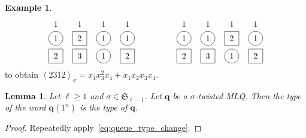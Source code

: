 \documentclass[reqno]{amsart}
\newcommand{\0}{\phantom{c}}
\newcommand{\swt}[1]{\left\langle #1 \right\rangle} %
\newcommand{\SymGp}[1]{\mathfrak{S}_{#1}} %
\newcommand{\qq}{\mathbf{q}}
\newenvironment{vershort}{}{}
\theoremstyle{plain}
\newtheorem{lemma}[thm]{Lemma}
\theoremstyle{definition}
\newtheorem{example}[thm]{Example}
\numberwithin{equation}{section}
\begin{document}
\begin{example}
\[
\begin{tikzpicture}[baseline=-30]
  \def\ll{0.75}   %
  \foreach \i in {1,3,4} { \draw (\i,\ll*-1) circle (0.3); }
  \foreach \i in {2} { \draw (\i-.3,\ll*-1 -.3) rectangle +(0.6,+0.6); }
  \foreach \i in {3} { \draw (\i,\ll*-2) circle (0.3); }
  \foreach \i in {1,2,4} { \draw (\i-.3,\ll*-2 -.3) rectangle +(0.6,+0.6); }
  \foreach \i in {1,2,3,4} { \node at (\i, \ll*0-.15) {$1$}; }
  \foreach \i in {1,3,4} { \node at (\i, \ll*-1) {$1$}; }
  \foreach \i in {2} { \node at (\i, \ll*-1) {$2$}; }
  \foreach \i in {3} { \node at (\i, \ll*-2) {$1$}; }
  \foreach \i in {1,4} { \node at (\i, \ll*-2) {$2$}; }
  \foreach \i in {2} { \node at (\i, \ll*-2) {$3$}; }
\end{tikzpicture}
\hspace{50pt}
\begin{tikzpicture}[baseline=-30]
  \def\ll{0.75}   %
  \foreach \i in {1,2,4} { \draw (\i,\ll*-1) circle (0.3); }
  \foreach \i in {3} { \draw (\i-.3,\ll*-1 -.3) rectangle +(0.6,+0.6); }
  \foreach \i in {3} { \draw (\i,\ll*-2) circle (0.3); }
  \foreach \i in {1,2,4} { \draw (\i-.3,\ll*-2 -.3) rectangle +(0.6,+0.6); }
  \foreach \i in {1,2,3,4} { \node at (\i, \ll*0-.15) {$1$}; }
  \foreach \i in {1,2,4} { \node at (\i, \ll*-1) {$1$}; }
  \foreach \i in {3} { \node at (\i, \ll*-1) {$2$}; }
  \foreach \i in {3} { \node at (\i, \ll*-2) {$1$}; }
  \foreach \i in {1,4} { \node at (\i, \ll*-2) {$2$}; }
  \foreach \i in {2} { \node at (\i, \ll*-2) {$3$}; }
\end{tikzpicture}
\]
to obtain $\swt{2312}_{\sigma} = x_1 x_3^2 x_4 + x_1 x_2 x_3 x_4$.
\end{example}

\begin{lemma}
\label{lemma:mlq-type}
Let $\ell \geq 1$ and $\sigma \in \SymGp{\ell-1}$.
Let $\qq$ be a $\sigma$-twisted MLQ.
Then the type of the word $\qq(1^n)$ is the type of $\qq$.
\end{lemma}

\begin{vershort}
\begin{proof}
Repeatedly apply~\eqref{eq:queue_type_change}.
\end{proof}
\end{vershort}
\end{document}
